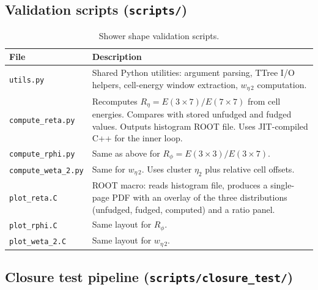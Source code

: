 \documentclass[12pt,a4paper]{article}
\begin{document}
\subsection{Validation scripts (\texttt{scripts/})}

\begin{table}[htbp]
\centering
\caption{Shower shape validation scripts.}
\label{tab:scripts:validation}
\small
\begin{tabular}{lp{9cm}}
\toprule
\textbf{File} & \textbf{Description} \\
\midrule
\texttt{utils.py}
  & Shared Python utilities: argument parsing, TTree I/O helpers,
    cell-energy window extraction, $w_{\eta\,2}$ computation. \\
\texttt{compute\_reta.py}
  & Recomputes $R_\eta = E(3\times7)/E(7\times7)$ from cell energies.
    Compares with stored unfudged and fudged values. Outputs histogram
    ROOT file. Uses JIT-compiled C++ for the inner loop. \\
\texttt{compute\_rphi.py}
  & Same as above for $R_\phi = E(3\times3)/E(3\times7)$. \\
\texttt{compute\_weta\_2.py}
  & Same for $w_{\eta\,2}$. Uses cluster $\eta_2$ plus relative cell
    offsets. \\
\texttt{plot\_reta.C}
  & ROOT macro: reads histogram file, produces a single-page PDF with
    an overlay of the three distributions (unfudged, fudged, computed)
    and a ratio panel. \\
\texttt{plot\_rphi.C}
  & Same layout for $R_\phi$. \\
\texttt{plot\_weta\_2.C}
  & Same layout for $w_{\eta\,2}$. \\
\bottomrule
\end{tabular}
\end{table}

\subsection{Closure test pipeline (\texttt{scripts/closure\_test/})}
\end{document}
